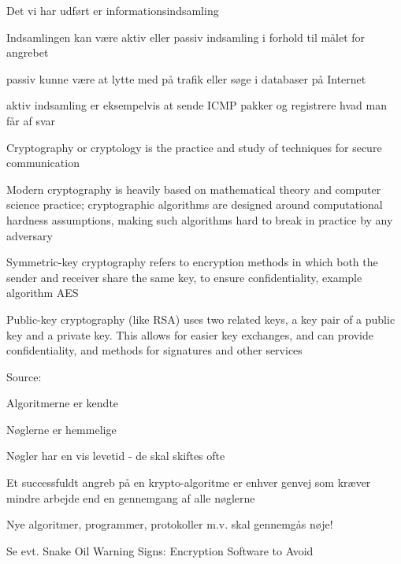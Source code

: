 \documentclass[Screen16to9,17pt]{foils}
\begin{document}



\begin{list1}
\item Det vi har udført er informationsindsamling
\item Indsamlingen kan være aktiv eller passiv indsamling i forhold
  til målet for angrebet
\item passiv kunne være at lytte med på trafik eller søge i databaser
  på Internet
\item aktiv indsamling er eksempelvis at sende ICMP pakker og
  registrere hvad man får af svar
\end{list1}



\begin{list1}
\item Cryptography or cryptology is the practice and study of techniques for secure communication
\item Modern cryptography is heavily based on mathematical theory and computer science practice; cryptographic algorithms are designed around computational hardness assumptions, making such algorithms hard to break in practice by any adversary
\item Symmetric-key cryptography refers to encryption methods in which both the sender and receiver share the same key, to ensure confidentiality, example algorithm AES
\item Public-key cryptography (like RSA) uses two related keys, a key pair of a public key and a private key. This allows for easier key exchanges, and can provide confidentiality, and methods for signatures and other services
\end{list1}

Source: 


\begin{list1}
\item Algoritmerne er kendte
\item Nøglerne er hemmelige
\item Nøgler har en vis levetid - de skal skiftes ofte
\item Et successfuldt angreb på en krypto-algoritme er enhver genvej
  som kræver mindre arbejde end en gennemgang af alle nøglerne
\item Nye algoritmer, programmer, protokoller m.v. skal gennemgås nøje!
\item Se evt. Snake Oil Warning Signs:
Encryption Software to Avoid\\
\end{list1}
\end{document}
